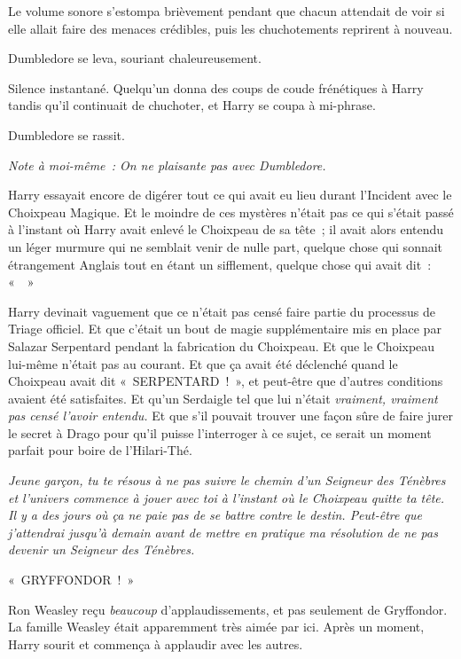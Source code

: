 Le volume sonore s'estompa brièvement pendant que chacun attendait de voir si elle allait faire des menaces crédibles, puis les chuchotements reprirent à nouveau.

Dumbledore se leva, souriant chaleureusement.

Silence instantané. Quelqu'un donna des coups de coude frénétiques à Harry tandis qu'il continuait de chuchoter, et Harry se coupa à mi-phrase.

Dumbledore se rassit.

\emph{Note à moi-même~: On ne plaisante pas avec Dumbledore.}

Harry essayait encore de digérer tout ce qui avait eu lieu durant l'Incident avec le Choixpeau Magique. Et le moindre de ces mystères n'était pas ce qui s'était passé à l'instant où Harry avait enlevé le Choixpeau de sa tête~; il avait alors entendu un léger murmure qui ne semblait venir de nulle part, quelque chose qui sonnait étrangement Anglais tout en étant un sifflement, quelque chose qui avait dit~: «~~»

Harry devinait vaguement que ce n'était pas censé faire partie du processus de Triage officiel. Et que c'était un bout de magie supplémentaire mis en place par Salazar Serpentard pendant la fabrication du Choixpeau. Et que le Choixpeau lui-même n'était pas au courant. Et que ça avait été déclenché quand le Choixpeau avait dit «~SERPENTARD~!~», et peut-être que d'autres conditions avaient été satisfaites. Et qu'un Serdaigle tel que lui n'était \emph{vraiment, vraiment pas censé l'avoir entendu.} Et que s'il pouvait trouver une façon sûre de faire jurer le secret à Drago pour qu'il puisse l'interroger à ce sujet, ce serait un moment parfait pour boire de l'Hilari-Thé.

\emph{Jeune garçon, tu te résous à ne pas suivre le chemin d'un Seigneur des Ténèbres et l'univers commence à jouer avec toi à l'instant où le Choixpeau quitte ta tête. Il y a des jours où ça ne paie pas de se battre contre le destin. Peut-être que j'attendrai jusqu'à demain avant de mettre en pratique ma résolution de ne pas devenir un Seigneur des Ténèbres.}

«~GRYFFONDOR~!~»

Ron Weasley reçu \emph{beaucoup} d'applaudissements, et pas seulement de Gryffondor. La famille Weasley était apparemment très aimée par ici. Après un moment, Harry sourit et commença à applaudir avec les autres.

